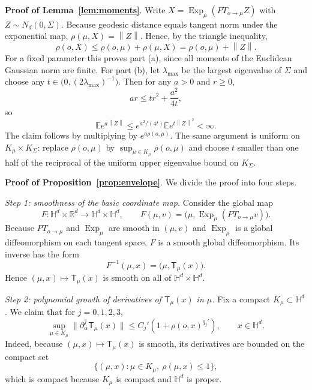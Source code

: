 \documentclass[11pt]{article}
\newcommand{\R}{\mathbb{R}}
\newcommand{\E}{\mathbb{E}}
\newcommand{\Hh}{\mathbb{H}}
\newcommand{\Exp}{\operatorname{Exp}}
\newcommand{\norm}[1]{\left\lVert #1\right\rVert}
\newcommand{\T}{\mathsf{T}}
\begin{document}
\medskip 
\noindent \textbf{Proof of Lemma~\ref{lem:moments}}. Write $X=\Exp_{\mu}(PT_{o\to \mu}Z)$ with $Z\sim N_d(0,\Sigma)$. Because geodesic distance equals tangent norm under the exponential map,  $\rho(\mu,X)=\norm{Z}$. Hence, by the triangle inequality,
\[
\rho(o,X)\le \rho(o,\mu)+\rho(\mu,X)=\rho(o,\mu)+\norm{Z}.
\]
For a fixed parameter this proves part (a), since all moments of the Euclidean Gaussian norm are finite. For part (b), let $\lambda_{\max}$ be the largest eigenvalue of $\Sigma$ and choose any $t\in\bigl(0,(2\lambda_{\max})^{-1}\bigr)$. Then for any $a>0$ and $r\ge 0$,
\[
ar\le tr^2+\frac{a^2}{4t},
\]
so
\[
\E e^{a\norm{Z}}\le e^{a^2/(4t)}\E e^{t\norm{Z}^2}<\infty.
\]
The claim follows by multiplying by $e^{a\rho(o,\mu)}$. The same argument is uniform on $K_\mu\times K_\Sigma$: replace $\rho(o,\mu)$ by $\sup_{\mu\in K_\mu}\rho(o,\mu)$ and choose $t$ smaller than one half of the reciprocal of the uniform upper eigenvalue bound on $K_\Sigma$.


\medskip
\noindent \textbf{Proof of Proposition~\ref{prop:envelope}}. 
We divide the proof into four steps.

\smallskip
\noindent\emph{Step 1: smoothness of the basic coordinate map.}
Consider the global map
\[
F:\Hh^d\times\R^d\to \Hh^d\times \Hh^d,
\qquad
F(\mu,v)=\bigl(\mu,\Exp_\mu(PT_{o\to \mu}v)\bigr).
\]
Because $PT_{o\to\mu}$ and $\Exp_\mu$ are smooth in $(\mu,v)$ and $\Exp_\mu$ is a global diffeomorphism on each tangent space, $F$ is a smooth global diffeomorphism. Its inverse has the form
\[
F^{-1}(\mu,x)=\bigl(\mu,\T_\mu(x)\bigr).
\]
Hence $(\mu,x)\mapsto \T_\mu(x)$ is smooth on all of $\Hh^d\times\Hh^d$.

\smallskip
\noindent\emph{Step 2: polynomial growth of derivatives of $\T_\mu(x)$ in $\mu$.}
Fix a compact $K_\mu\subset\Hh^d$. We claim that for $j=0,1,2,3$,
\begin{equation}
\label{eq:T-growth}
\sup_{\mu\in K_\mu}\bigl\|\partial_\alpha^j \T_\mu(x)\bigr\|
\le C_j'(1+\rho(o,x)^{q_j'}),
\qquad x\in\Hh^d.
\end{equation}
Indeed, because $(\mu,x)\mapsto \T_\mu(x)$ is smooth, its derivatives are bounded on the compact set
\[
\{(\mu,x):\mu\in K_\mu,\ \rho(\mu,x)\le 1\},
\]
which is compact because $K_\mu$ is compact and $\Hh^d$ is proper.
\end{document}
